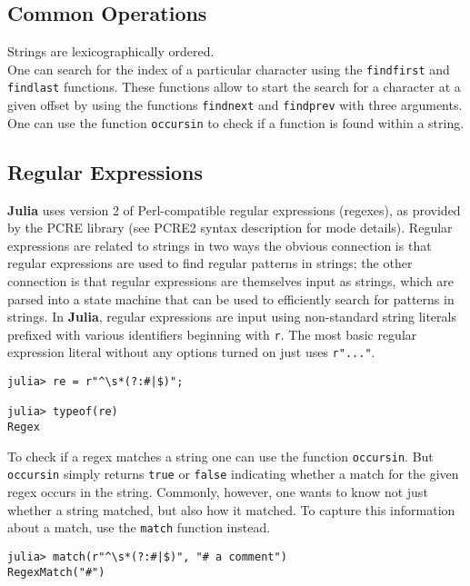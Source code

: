 \documentclass[
]{article}
\begin{document}
\hypertarget{common-operations}{%
\subsection{Common Operations}\label{common-operations}}

Strings are lexicographically ordered.\\
One can search for the index of a particular character using the
\texttt{findfirst} and \texttt{findlast} functions. These functions
allow to start the search for a character at a given offset by using the
functions \texttt{findnext} and \texttt{findprev} with three
arguments.\\
One can use the function \texttt{occursin} to check if a function is
found within a string.

\hypertarget{regular-expressions}{%
\subsection{Regular Expressions}\label{regular-expressions}}

\textbf{Julia} uses version 2 of Perl-compatible regular expressions
(regexes), as provided by the PCRE library (see PCRE2 syntax description
for mode details). Regular expressions are related to strings in two
ways the obvious connection is that regular expressions are used to find
regular patterns in strings; the other connection is that regular
expressions are themselves input as strings, which are parsed into a
state machine that can be used to efficiently search for patterns in
strings. In \textbf{Julia}, regular expressions are input using
non-standard string literals prefixed with various identifiers beginning
with \texttt{r}. The most basic regular expression literal without any
options turned on just uses \texttt{r"..."}.

\begin{verbatim}
julia> re = r"^\s*(?:#|$)";

julia> typeof(re)
Regex
\end{verbatim}

To check if a regex matches a string one can use the function
\texttt{occursin}. But \texttt{occursin} simply returns \texttt{true} or
\texttt{false} indicating whether a match for the given regex occurs in
the string. Commonly, however, one wants to know not just whether a
string matched, but also how it matched. To capture this information
about a match, use the \texttt{match} function instead.

\begin{verbatim}
julia> match(r"^\s*(?:#|$)", "# a comment")
RegexMatch("#")
\end{verbatim}
\end{document}
